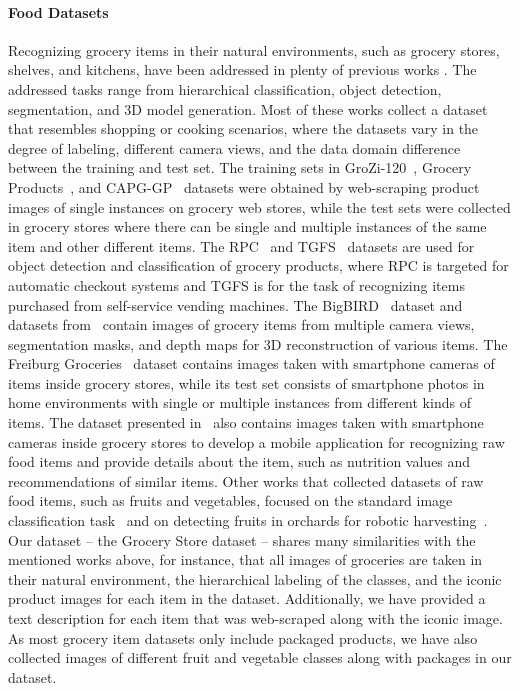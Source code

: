 \paragraph{Food Datasets} 
Recognizing grocery items in their natural environments, such as grocery stores, shelves, and kitchens, have been addressed in plenty of previous works . The addressed tasks range from hierarchical classification, object detection, segmentation, and 3D model generation. Most of these works collect a dataset that resembles shopping or cooking scenarios, where the datasets vary in the degree of labeling, different camera views, and the data domain difference between the training and test set. 
The training sets in GroZi-120~, Grocery Products~, and CAPG-GP~ datasets were obtained by web-scraping product images of single instances on grocery web stores, while the test sets were collected in grocery stores where there can be single and multiple instances of the same item and other different items.
The RPC~ and TGFS~ datasets are used for object detection and classification of grocery products, where RPC is targeted for automatic checkout systems and TGFS is for the task of recognizing items purchased from self-service vending machines.
The BigBIRD~ dataset and datasets from~ contain images of grocery items from multiple camera views, segmentation masks, and depth maps for 3D reconstruction of various items. 
The Freiburg Groceries~ dataset contains images taken with smartphone cameras of items inside grocery stores, while its test set consists of smartphone photos in home environments with single or multiple instances from different kinds of items. The dataset presented in~ also contains images taken with smartphone cameras inside grocery stores to develop a mobile application for recognizing raw food items and provide details about the item, such as nutrition values and recommendations of similar items. Other works that collected datasets of raw food items, such as fruits and vegetables, focused on the standard image classification task~ and on detecting fruits in orchards for robotic harvesting~. Our dataset -- the Grocery Store dataset -- shares many similarities with the mentioned works above, for instance, that all images of groceries are taken in their natural environment, the hierarchical labeling of the classes, and the iconic product images for each item in the dataset. Additionally, we have provided a text description for each item that was web-scraped along with the iconic image. As most grocery item datasets only include packaged products, we have also collected images of different fruit and vegetable classes along with packages in our dataset. 

